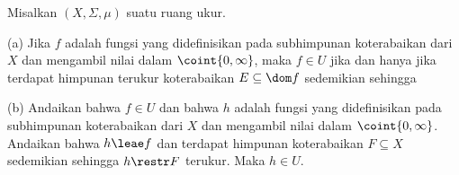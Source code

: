  Misalkan $(X,\Sigma,\mu)$ suatu ruang
ukur.

(a) Jika $f$ adalah fungsi yang didefinisikan pada subhimpunan
koterabaikan dari $X$ dan mengambil nilai dalam $\coint{0,\infty}$,
maka $f\in U$ jika dan hanya jika terdapat himpunan terukur
koterabaikan $E\subseteq\dom f$ sedemikian sehingga


(b) Andaikan bahwa $f\in U$ dan bahwa $h$ adalah fungsi yang
didefinisikan pada subhimpunan koterabaikan dari $X$ dan mengambil
nilai dalam $\coint{0,\infty}$. Andaikan bahwa $h\leae f$ dan terdapat
himpunan koterabaikan $F\subseteq X$ sedemikian sehingga $h\restr F$
terukur. Maka $h\in U$.

